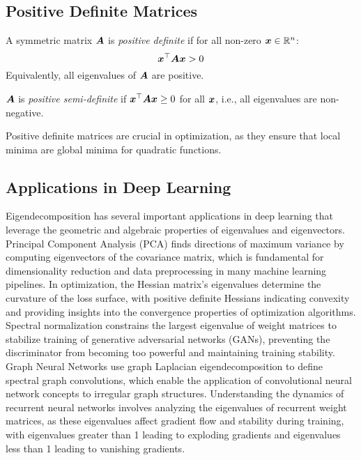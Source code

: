 \subsection{Positive Definite Matrices}

\begin{definition}
A symmetric matrix $\boldsymbol{A}$ is \emph{positive definite} if for all non-zero $\boldsymbol{x} \in \mathbb{R}^n$:
\begin{equation}
    \boldsymbol{x}^\top\boldsymbol{A}\boldsymbol{x} > 0
\end{equation}
Equivalently, all eigenvalues of $\boldsymbol{A}$ are positive.
\end{definition}

\begin{definition}
$\boldsymbol{A}$ is \emph{positive semi-definite} if $\boldsymbol{x}^\top\boldsymbol{A}\boldsymbol{x} \geq 0$ for all $\boldsymbol{x}$, i.e., all eigenvalues are non-negative.
\end{definition}

Positive definite matrices are crucial in optimization, as they ensure that local minima are global minima for quadratic functions.

\subsection{Applications in Deep Learning}

Eigendecomposition has several important applications in deep learning that leverage the geometric and algebraic properties of eigenvalues and eigenvectors. Principal Component Analysis (PCA) finds directions of maximum variance by computing eigenvectors of the covariance matrix, which is fundamental for dimensionality reduction and data preprocessing in many machine learning pipelines. In optimization, the Hessian matrix's eigenvalues determine the curvature of the loss surface, with positive definite Hessians indicating convexity and providing insights into the convergence properties of optimization algorithms. Spectral normalization constrains the largest eigenvalue of weight matrices to stabilize training of generative adversarial networks (GANs), preventing the discriminator from becoming too powerful and maintaining training stability. Graph Neural Networks use graph Laplacian eigendecomposition to define spectral graph convolutions, which enable the application of convolutional neural network concepts to irregular graph structures. Understanding the dynamics of recurrent neural networks involves analyzing the eigenvalues of recurrent weight matrices, as these eigenvalues affect gradient flow and stability during training, with eigenvalues greater than 1 leading to exploding gradients and eigenvalues less than 1 leading to vanishing gradients.

